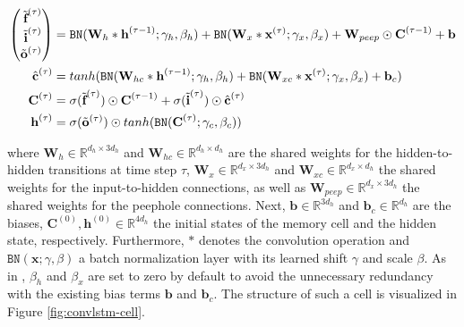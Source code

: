 \begin{equation} \label{eq:convlstm}
\begin{aligned}
\Spvek{\tilde{\textbf{f}}^{(\tau)}; \tilde{\textbf{i}}^{(\tau)}; \tilde{\textbf{o}}^{(\tau)}} &= \texttt{BN}(\textbf{W}_{h} \ast \textbf{h}^{(\tau-1)}; \gamma_h, \beta_h) + \texttt{BN}(\textbf{W}_{x} \ast \textbf{x}^{(\tau)}; \gamma_x, \beta_x) + \textbf{W}_{peep} \odot \textbf{C}^{(\tau-1)} + \textbf{b} \\
\hat{\textbf{c}}^{(\tau)} &= tanh(\texttt{BN}(\textbf{W}_{hc} \ast \textbf{h}^{(\tau-1)}; \gamma_h, \beta_h) + \texttt{BN}(\textbf{W}_{xc} \ast \textbf{x}^{(\tau)}; \gamma_x, \beta_x) + \textbf{b}_c) \\
\textbf{C}^{(\tau)} &= \sigma(\tilde{\textbf{f}}^{(\tau)}) \odot \textbf{C}^{(\tau-1)} + \sigma(\tilde{\textbf{i}}^{(\tau)}) \odot \hat{\textbf{c}}^{(\tau)} \\
\textbf{h}^{(\tau)} &= \sigma(\tilde{\textbf{o}}^{(\tau)}) \odot tanh(\texttt{BN}(\textbf{C}^{(\tau)}; \gamma_c, \beta_c))
\end{aligned}
\end{equation}

where $ \textbf{W}_h \in \mathbb{R}^{d_h \times 3d_h} $ and $ \textbf{W}_{hc} \in \mathbb{R}^{d_h \times d_h} $ are the shared weights for the hidden-to-hidden transitions at time step $ \tau $, $ \textbf{W}_x \in \mathbb{R}^{d_x \times 3d_h} $ and $ \textbf{W}_{xc} \in \mathbb{R}^{d_x \times d_h} $ the shared weights for the input-to-hidden connections, as well as $ \textbf{W}_{peep} \in \mathbb{R}^{d_x \times 3d_h} $ the shared weights for the peephole connections. Next, $ \textbf{b} \in \mathbb{R}^{3d_h} $ and $ \textbf{b}_c \in \mathbb{R}^{d_h} $ are the biases, $ \textbf{C}^{(0)}, \textbf{h}^{(0)} \in \mathbb{R}^{4d_h} $ the initial states of the memory cell and the hidden state, respectively. Furthermore, $\ast$ denotes the convolution operation and $ \texttt{BN}(\textbf{x}; \gamma, \beta) $ a batch normalization layer with its learned shift $\gamma$ and scale $\beta$. As in \parencite{rnn-batchnorm}, $\beta_h$ and $\beta_x$ are set to zero by default to avoid the unnecessary redundancy with the existing bias terms $\textbf{b}$ and $\textbf{b}_c$. The structure of such a cell is visualized in Figure \ref{fig:convlstm-cell}.

